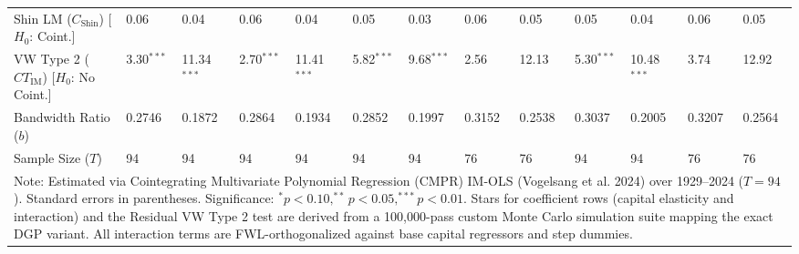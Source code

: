 \begin{table}[H]
\begin{tabular}{p{3.8cm}p{1.1cm}p{1.1cm}p{1.1cm}p{1.1cm}p{1.1cm}p{1.1cm}p{1.1cm}p{1.1cm}p{1.1cm}p{1.1cm}p{1.1cm}p{1.1cm}}
Shin LM ($C_{\text{Shin}}$) [$H_0$: Coint.] & 0.06 & 0.04 & 0.06 & 0.04 & 0.05 & 0.03 & 0.06 & 0.05 & 0.05 & 0.04 & 0.06 & 0.05 \\
VW Type 2 ($CT_{\text{IM}}$) [$H_0$: No Coint.] & 3.30$^{***}$ & 11.34$^{***}$ & 2.70$^{***}$ & 11.41$^{***}$ & 5.82$^{***}$ & 9.68$^{***}$ & 2.56 & 12.13 & 5.30$^{***}$ & 10.48$^{***}$ & 3.74 & 12.92 \\
\midrule
Bandwidth Ratio ($b$) & 0.2746 & 0.1872 & 0.2864 & 0.1934 & 0.2852 & 0.1997 & 0.3152 & 0.2538 & 0.3037 & 0.2005 & 0.3207 & 0.2564 \\
Sample Size ($T$) & 94 & 94 & 94 & 94 & 94 & 94 & 76 & 76 & 94 & 94 & 76 & 76 \\
\bottomrule
\multicolumn{13}{p{14.5cm}}{\footnotesize Note: Estimated via Cointegrating Multivariate Polynomial Regression (CMPR) IM-OLS (Vogelsang et al. 2024) over 1929--2024 ($T=94$). Standard errors in parentheses. Significance: $^* p < 0.10, ^{**} p < 0.05, ^{***} p < 0.01$. Stars for coefficient rows (capital elasticity and interaction) and the Residual VW Type 2 test are derived from a 100,000-pass custom Monte Carlo simulation suite mapping the exact DGP variant. All interaction terms are FWL-orthogonalized against base capital regressors and step dummies.}
\end{tabular}
\end{table}
